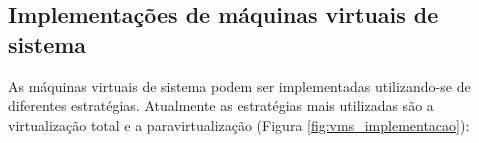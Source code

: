


\newpage
\subsection{Implementações de máquinas virtuais de sistema}
\label{section:virtestrat}

As máquinas virtuais de sistema podem ser implementadas utilizando-se de diferentes estratégias. Atualmente as estratégias mais utilizadas
são a virtualização total e a paravirtualização (Figura \ref{fig:vms_implementacao}):

